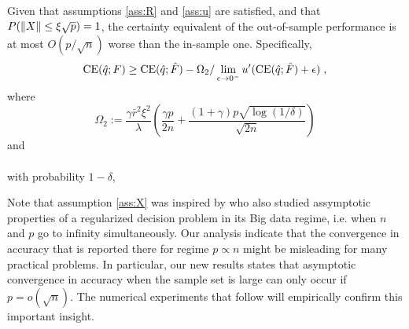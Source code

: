 \begin{coro}\label{coro:outsampleBoundBigData}
  Given that assumptions \ref{ass:R} and \ref{ass:u} are satisfied, and that
  $P(\|X\|\leq \xi\sqrt{p})=1$, the certainty equivalent of the out-of-sample
  performance is at most $O(p/\sqrt{n})$ worse than the in-sample one. Specifically,
  \[
    \operatorname{CE}({\hat{q}};F) \geq \operatorname{CE}({\hat{q}};{\hat{F}}) - \Omega_2/
    \lim_{\epsilon\to0^-}u'(\operatorname{CE}({\hat{q}};{\hat{F}})+\epsilon)\;,
  \]
  where
  \[
    \Omega_2 := \frac{\gamma\bar{r}^2\xi^2}{\lambda} \left(\frac{\gamma p}{2n} +
      \frac{(1+\gamma)p\sqrt{\log(1/\delta)}}{\sqrt{2n}}\right)
  \]
  and\\
  \\
  with probability $1-\delta$, 
\end{coro}

Note that assumption \ref{ass:X} was inspired by \cite{rudin2015big} who also studied
assymptotic properties of a regularized decision problem in its Big data regime, i.e. when
$n$ and $p$ go to infinity simultaneously. Our analysis indicate that the convergence in
accuracy that is reported there for regime $p\propto n$ might be misleading for many
practical problems.  In particular, our new results states that asymptotic convergence in
accuracy when the sample set is large can only occur if $p=o(\sqrt{n})$. The numerical
experiments that follow will empirically confirm this important insight.




